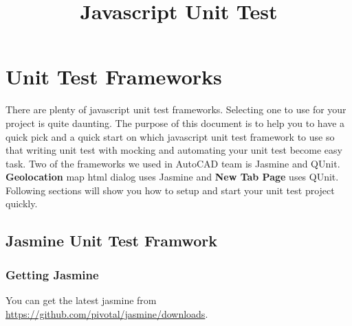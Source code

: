\documentclass[a4paper,11pt]{article}
\title{Javascript Unit Test}
\begin{document}
\maketitle
\tableofcontents
\pagebreak
\section{Unit Test Frameworks}
There are plenty of javascript unit test frameworks. Selecting one to use for your project is quite daunting. The purpose of this document is to help you to have a quick pick and a quick start on which javascript unit test framework to use so that writing unit test with mocking and automating your unit test become easy task. Two of the frameworks we used in AutoCAD team is Jasmine and QUnit. \textbf{Geolocation} map html dialog uses Jasmine and \textbf{New Tab Page} uses QUnit. Following sections will show you how to setup and start your unit test project quickly.
	\subsection{ Jasmine Unit Test Framwork }
	\subsubsection{ Getting Jasmine }	
	You can get the latest jasmine from \url{https://github.com/pivotal/jasmine/downloads}.
\end{document}
